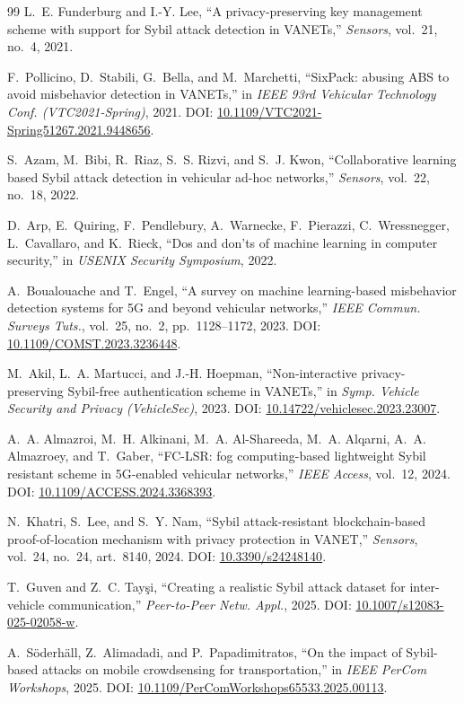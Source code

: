 \documentclass[journal,twoside]{IEEEtran}
\begin{document}
\begin{thebibliography}{99}
 L.~E. Funderburg and I.-Y. Lee, ``A privacy-preserving key management scheme with support for Sybil attack detection in VANETs,'' \emph{Sensors}, vol.~21, no.~4, 2021.

 F.~Pollicino, D.~Stabili, G.~Bella, and M.~Marchetti, ``SixPack: abusing ABS to avoid misbehavior detection in VANETs,'' in \emph{IEEE 93rd Vehicular Technology Conf. (VTC2021-Spring)}, 2021. DOI: \url{10.1109/VTC2021-Spring51267.2021.9448656}.

 S.~Azam, M.~Bibi, R.~Riaz, S.~S. Rizvi, and S.~J. Kwon, ``Collaborative learning based Sybil attack detection in vehicular ad-hoc networks,'' \emph{Sensors}, vol.~22, no.~18, 2022.

 D.~Arp, E.~Quiring, F.~Pendlebury, A.~Warnecke, F.~Pierazzi, C.~Wressnegger, L.~Cavallaro, and K.~Rieck, ``Dos and don'ts of machine learning in computer security,'' in \emph{USENIX Security Symposium}, 2022.

 A.~Boualouache and T.~Engel, ``A survey on machine learning-based misbehavior detection systems for 5G and beyond vehicular networks,'' \emph{IEEE Commun. Surveys Tuts.}, vol.~25, no.~2, pp.~1128--1172, 2023. DOI: \url{10.1109/COMST.2023.3236448}.

 M.~Akil, L.~A. Martucci, and J.-H. Hoepman, ``Non-interactive privacy-preserving Sybil-free authentication scheme in VANETs,'' in \emph{Symp. Vehicle Security and Privacy (VehicleSec)}, 2023. DOI: \url{10.14722/vehiclesec.2023.23007}.

 A.~A. Almazroi, M.~H. Alkinani, M.~A. Al-Shareeda, M.~A. Alqarni, A.~A. Almazroey, and T.~Gaber, ``FC-LSR: fog computing-based lightweight Sybil resistant scheme in 5G-enabled vehicular networks,'' \emph{IEEE Access}, vol.~12, 2024. DOI: \url{10.1109/ACCESS.2024.3368393}.

 N.~Khatri, S.~Lee, and S.~Y. Nam, ``Sybil attack-resistant blockchain-based proof-of-location mechanism with privacy protection in VANET,'' \emph{Sensors}, vol.~24, no.~24, art.~8140, 2024. DOI: \url{10.3390/s24248140}.

 T.~Guven and Z.~C. Tay\c{s}i, ``Creating a realistic Sybil attack dataset for inter-vehicle communication,'' \emph{Peer-to-Peer Netw. Appl.}, 2025. DOI: \url{10.1007/s12083-025-02058-w}.

 A.~S\"oderh\"all, Z.~Alimadadi, and P.~Papadimitratos, ``On the impact of Sybil-based attacks on mobile crowdsensing for transportation,'' in \emph{IEEE PerCom Workshops}, 2025. DOI: \url{10.1109/PerComWorkshops65533.2025.00113}.


\end{thebibliography}
\end{document}
